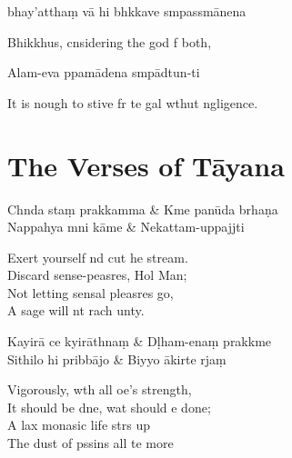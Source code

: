 bhay'atthaṃ vā hi bhkkave smpassmānena

\begin{english}
  Bhikkhus, cnsidering the god f both,
\end{english}

Alam-eva ppamādena smpādtun-ti

\begin{english}
  It is nough to stive fr te gal wthut ngligence.
\end{english}

\chapter{The Verses of Tāyana}%

\begin{leader}
\end{leader}

\begin{twochants}
  Chnda staṃ prakkamma & Kme panūda brhaṇa \\
  Nappahya mni kāme & Nekattam-uppajjti \\
\end{twochants}

\begin{english}
  Exert yourself nd cut he stream.\\
  Discard sense-peasres, Hol Man;\\
  Not letting sensal pleasres go,\\
  A sage will nt rach unty.
\end{english}

\begin{twochants}
  Kayirā ce kyirāthnaṃ & Dḷham-enaṃ prakkme \\
  Sithilo hi pribbājo & Biyyo ākirte rjaṃ \\
\end{twochants}

\begin{english}
  Vigorously, wth all oe's strength,\\
  It should be dne, wat should e done;\\
  A lax monasic life strs up\\
  The dust of pssins all te more
\end{english}

